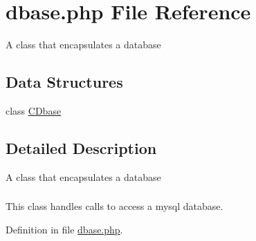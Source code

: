 \hypertarget{dbase_8php}{\section{dbase.\+php File Reference}
\label{dbase_8php}
}


A class that encapsulates a database \subsubsection*{} 


\subsection*{Data Structures}
\begin{DoxyCompactItemize}
\item 
class \hyperlink{class_c_dbase}{C\+Dbase}
\end{DoxyCompactItemize}


\subsection{Detailed Description}
A class that encapsulates a database \subsubsection*{}



 



This class handles calls to access a mysql database.  

Definition in file \hyperlink{dbase_8php_source}{dbase.\+php}.

